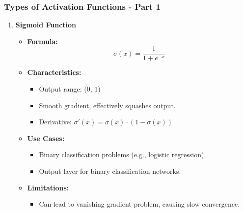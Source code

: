 \documentclass{beamer}
\begin{document}
\begin{frame}[fragile]
    \frametitle{Types of Activation Functions - Part 1}
    \begin{enumerate}
        \item \textbf{Sigmoid Function}
            \begin{itemize}
                \item \textbf{Formula:}
                \[
                \sigma(x) = \frac{1}{1 + e^{-x}}
                \]
                \item \textbf{Characteristics:}
                    \begin{itemize}
                        \item Output range: (0, 1)
                        \item Smooth gradient, effectively squashes output.
                        \item Derivative: \(\sigma'(x) = \sigma(x) \cdot (1 - \sigma(x))\)
                    \end{itemize}
                \item \textbf{Use Cases:}
                    \begin{itemize}
                        \item Binary classification problems (e.g., logistic regression).
                        \item Output layer for binary classification networks.
                    \end{itemize}
                \item \textbf{Limitations:}
                    \begin{itemize}
                        \item Can lead to vanishing gradient problem, causing slow convergence.
                    \end{itemize}
            \end{itemize}
    \end{enumerate}
\end{frame}
\end{document}
